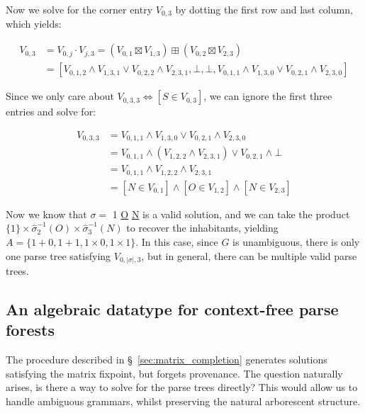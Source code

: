 \documentclass[sigplan,acmsmall,nonacm,screen]{acmart}\settopmatter{printfolios=false,printccs=false,printacmref=false}
\begin{document}
  \noindent Now we solve for the corner entry $V_{0, 3}$ by dotting the first row and last column, which yields:\vspace{-8pt}

  \begin{align*}
    V_{0, 3} &= V_{0, j} \cdot V_{j, 3} = (V_{0, 1} \boxtimes V_{1, 3}) \boxplus (V_{0, 2} \boxtimes V_{2, 3})\\
    &= [V_{0, 1, 2} \land V_{1, 3, 1} \lor V_{0, 2, 2} \land V_{2, 3, 1}, \bot, \bot, V_{0, 1, 1} \land V_{1, 3, 0} \lor V_{0, 2, 1} \land V_{2, 3, 0}]
  \end{align*}

  \noindent Since we only care about $V_{0, 3, 3} \Leftrightarrow [S \in V_{0, 3}]$, we can ignore the first three entries and solve for:\vspace{-8pt}

  \begin{align*}
    V_{0, 3, 3} &= V_{0, 1, 1} \land V_{1, 3, 0} \lor V_{0, 2, 1} \land V_{2, 3, 0}\\
    &= V_{0, 1, 1} \land (V_{1, 2, 2} \land V_{2, 3, 1}) \lor V_{0, 2, 1} \land \bot\\
    &= V_{0, 1, 1} \land V_{1, 2, 2} \land V_{2, 3, 1}\\
    &= [N \in V_{0, 1}] \land [O \in V_{1, 2}] \land [N \in V_{2, 3}]
  \end{align*}

  Now we know that $\sigma =$ 1 \underline{O} \underline{N} is a valid solution, and we can take the product $\{1\}\times \hat\sigma_2^{-1}(O) \times \hat\sigma_3^{-1}(N)$ to recover the inhabitants, yielding $A=\{1+0, 1+1, 1\times 0, 1\times 1\}$. In this case, since $G$ is unambiguous, there is only one parse tree satisfying $V_{0, |\sigma|, 3}$, but in general, there can be multiple valid parse trees.

  \subsection{An algebraic datatype for context-free parse forests}\label{sec:ptree}

  The procedure described in \S~\ref{sec:matrix_completion} generates solutions satisfying the matrix fixpoint, but forgets provenance. The question naturally arises, is there a way to solve for the parse trees directly? This would allow us to handle ambiguous grammars, whilst preserving the natural arborescent structure.
\end{document}
